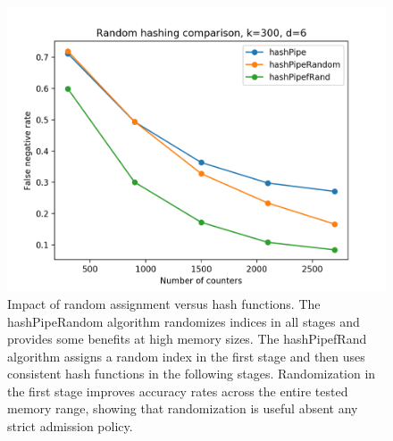\begin{figure}[!htb]
  \centering
    \includegraphics[scale=0.5]{interview}
     \caption{Impact of random assignment versus hash functions. The hashPipeRandom algorithm randomizes indices in all stages and provides some benefits at high memory sizes. The hashPipefRand algorithm assigns a random index in the first stage and then uses consistent hash functions in the following stages. Randomization in the first stage improves accuracy rates across the entire tested memory range, showing that randomization is useful absent any strict admission policy.}
     \label{fig:interview}
\end{figure}
